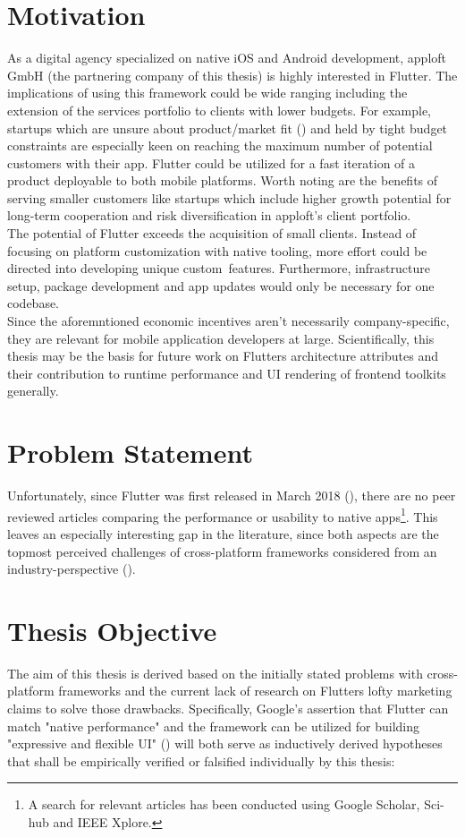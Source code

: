 \section{Motivation}
\label{section:motivation}
As a digital agency specialized on native iOS and Android development, apploft GmbH 
(the partnering company of this thesis) is highly interested in Flutter. 
The implications of using this framework could be wide ranging including the extension of the services portfolio
to clients with lower budgets.
For example, startups which are unsure about product/market fit (\cite{Andreesen2007}) and held by tight budget constraints are especially keen on reaching 
the maximum number of potential customers with their app. Flutter could be utilized for a fast iteration of a product deployable to 
both mobile platforms. 
Worth noting are the benefits of serving smaller customers like startups which include higher growth potential for long-term cooperation
and risk diversification in apploft's client portfolio.\\
The potential of Flutter exceeds the acquisition of small clients. Instead of focusing on platform customization with native tooling, more effort could 
be directed into developing unique custom features.
Furthermore, infrastructure setup, package development and app updates would only be necessary for one codebase.\\
Since the aforemntioned economic incentives aren't necessarily company-specific, they are relevant for mobile application developers at large.
Scientifically, this thesis may be the basis for future work on Flutters architecture attributes and their contribution to runtime performance and UI rendering of frontend toolkits generally.

\section{Problem Statement}
Unfortunately, since Flutter was first released in March 2018 (\cite{FlutterReleases2020}), 
there are no peer reviewed articles comparing the performance or usability to native apps\footnote{A search for relevant articles has been conducted using Google Scholar, Sci-hub and IEEE Xplore.}. 
This leaves an especially interesting gap in the literature, since both aspects are the topmost perceived challenges of cross-platform frameworks considered from an industry-perspective (\cite{BioernHansen2019}).

\section{Thesis Objective}
The aim of this thesis is derived based on the initially stated problems with cross-platform frameworks and the current lack of research on Flutters lofty marketing claims to solve those drawbacks.
Specifically, Google's assertion that Flutter can match "native performance" and the framework can be utilized for building "expressive and flexible UI" (\cite{FlutterDev20})
will both serve as inductively derived hypotheses that shall be empirically verified or falsified individually by this thesis:

